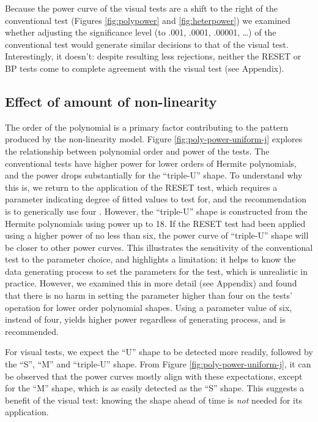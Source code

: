 \documentclass[]{interact}
\theoremstyle{plain}%
\theoremstyle{definition}
\theoremstyle{remark}
\begin{document}
Because the power curve of the visual tests are a shift to the right of
the conventional test (Figures \ref{fig:polypower} and
\ref{fig:heterpower}) we examined whether adjusting the significance
level (to .001, .0001, .00001, \ldots) of the conventional test would
generate similar decisions to that of the visual test. Interestingly, it
doesn't: despite resulting less rejections, neither the RESET or BP
tests come to complete agreement with the visual test (see Appendix).

\hypertarget{effect-of-amount-of-non-linearity}{%
\subsection{\texorpdfstring{Effect of amount of
non-linearity\label{nonlin-analysis}}{Effect of amount of non-linearity}}\label{effect-of-amount-of-non-linearity}}

The order of the polynomial is a primary factor contributing to the
pattern produced by the non-linearity model. Figure
\ref{fig:poly-power-uniform-j} explores the relationship between
polynomial order and power of the tests. The conventional tests have
higher power for lower orders of Hermite polynomials, and the power
drops substantially for the ``triple-U'' shape. To understand why this
is, we return to the application of the RESET test, which requires a
parameter indicating degree of fitted values to test for, and the
recommendation is to generically use four \citep{ramsey_tests_1969}.
However, the ``triple-U'' shape is constructed from the Hermite
polynomials using power up to 18. If the RESET test had been applied
using a higher power of no less than six, the power curve of
``triple-U'' shape will be closer to other power curves. This
illustrates the sensitivity of the conventional test to the parameter
choice, and highlights a limitation: it helps to know the data
generating process to set the parameters for the test, which is
unrealistic in practice. However, we examined this in more detail (see
Appendix) and found that there is no harm in setting the parameter
higher than four on the tests' operation for lower order polynomial
shapes. Using a parameter value of six, instead of four, yields higher
power regardless of generating process, and is recommended.

For visual tests, we expect the ``U'' shape to be detected more readily,
followed by the ``S'', ``M'' and ``triple-U'' shape. From Figure
\ref{fig:poly-power-uniform-j}, it can be observed that the power curves
mostly align with these expectations, except for the ``M'' shape, which
is as easily detected as the ``S'' shape. This suggests a benefit of the
visual test: knowing the shape ahead of time is \emph{not} needed for
its application.
\end{document}
